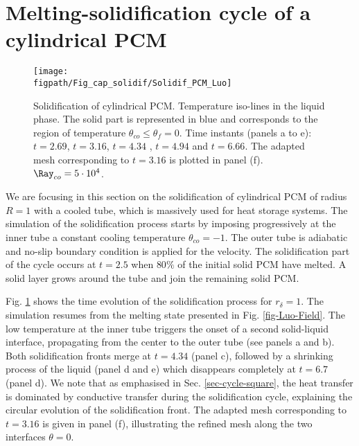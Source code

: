 \section{Melting-solidification cycle of a cylindrical PCM} \label{sec-cycle-cylindric}
\begin{figure}
\begin{center}
\begin{minipage}[t]{0.9\textwidth}
	\texttt{[image: \\figpath/Fig\_cap\_solidif/Solidif\_PCM\_Luo]}
\end{minipage}
\end{center}
\caption{Solidification of cylindrical PCM. Temperature iso-lines in the liquid phase. The solid part is represented in blue and corresponds to the region of temperature $\theta_{co} \leq \theta_f=0$. Time instants (panels  a to e): $t= 2.69$, $t = 3.16$, $t = 4.34$ , $t = 4.94$ and $t = 6.66$. The adapted mesh corresponding to $t = 3.16$ is plotted in panel (f).  $ \Ray_{co}=5 \cdot 10^4$.}\label{fig:cycle-cylindric-evol}
\end{figure}

We are focusing in this section on the solidification of cylindrical PCM of radius $R=1$ with a cooled tube, which is massively used for heat storage systems.
The simulation of the solidification process starts by imposing progressively at the inner tube a constant cooling temperature $\theta_{co} = -1$.
The outer tube is adiabatic and no-slip boundary condition is applied for the velocity.
The solidification part of the cycle occurs at $t = 2.5$ when $80 \%$ of the initial solid PCM have melted.
A solid layer grows around the tube and join the remaining solid PCM.

Fig. \ref{fig:cycle-cylindric-evol} shows the time evolution of the solidification process for $r_{\delta} = 1$.
The simulation resumes from the melting state presented in Fig. \ref{fig-Luo-Field}.
The low temperature at the inner tube triggers the onset of a second solid-liquid interface, propagating from the center to the outer tube (see panels a and b).
Both solidification fronts merge  at $t = 4.34$ (panel c), followed by a shrinking process of the liquid (panel d and e) which disappears completely at $t = 6.7$ (panel d).
We note that as emphasised in Sec. \ref{sec-cycle-square}, the heat transfer is dominated by conductive transfer during the solidification cycle, explaining the circular evolution of the solidification front.
The adapted mesh corresponding to $t = 3.16$ is given in panel (f), illustrating the refined mesh along the two interfaces $\theta = 0$.

